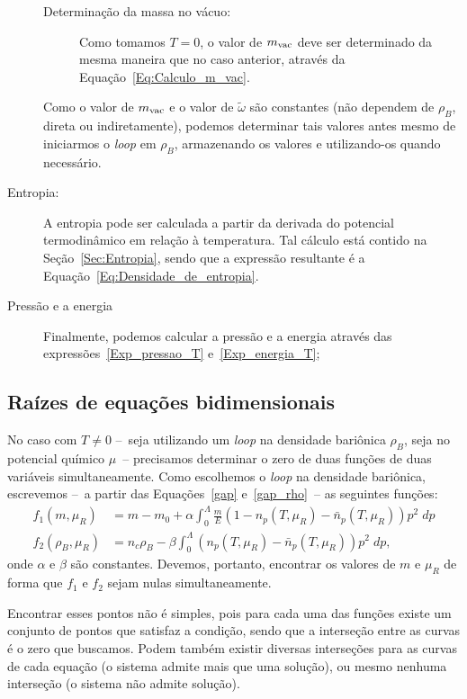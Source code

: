\begin{description}
\begin{description}
\begin{equation}
				\end{equation}
			\item[Determinação da massa no vácuo:] Como tomamos $T = 0$, o valor de $m_{\rm{vac}}$ deve ser determinado da mesma maneira que no caso anterior, através da Equação~\eqref{Eq:Calculo_m_vac}.
		\end{description}
		Como o valor de $m_{\rm{vac}}$ e o valor de $\tilde\omega$ são constantes (não dependem de $\rho_B$, direta ou indiretamente), podemos determinar tais valores antes mesmo de iniciarmos o \emph{loop} em $\rho_B$, armazenando os valores e utilizando-os quando necessário.
	\item[Entropia:] A entropia pode ser calculada a partir da derivada do potencial termodinâmico em relação à temperatura. Tal cálculo está contido na Seção~\ref{Sec:Entropia}, sendo que a expressão resultante é a Equação~\eqref{Eq:Densidade_de_entropia}.
	\item[Pressão e a energia] Finalmente, podemos calcular a pressão e a energia através das expressões~\eqref{Exp_pressao_T} e~\eqref{Exp_energia_T};
\end{description}

\subsection{Raízes de equações bidimensionais}

No caso com $T \neq 0$ --~seja utilizando um \emph{loop} na densidade bariônica $\rho_B$, seja no potencial químico $\mu$~-- precisamos determinar o zero de duas funções de duas variáveis simultaneamente. Como escolhemos o \emph{loop} na densidade bariônica, escrevemos --~a partir das Equações~\eqref{gap} e~\eqref{gap_rho}~-- as seguintes funções:
\begin{align}
	f_1(m, \mu_R) &= m - m_0 + \alpha\int_0^\Lambda \frac{m}{E} (1 - n_p(T, \mu_R) - \bar{n}_p(T, \mu_R)) p^2\;dp \\
	f_2(\rho_B, \mu_R) &= n_c\rho_B - \beta \int_0^\Lambda (n_p(T, \mu_R) - \bar{n}_p(T, \mu_R)) p^2\;dp,
\end{align}
%
onde $\alpha$ e $\beta$ são constantes. Devemos, portanto, encontrar os valores de $m$ e $\mu_R$ de forma que $f_1$ e $f_2$ sejam nulas simultaneamente.

Encontrar esses pontos não é simples, pois para cada uma das funções existe um conjunto de pontos que satisfaz a condição, sendo que a interseção entre as curvas é o zero que buscamos. Podem também existir diversas interseções para as curvas de cada equação (o sistema admite mais que uma solução), ou mesmo nenhuma interseção (o sistema não admite solução).

